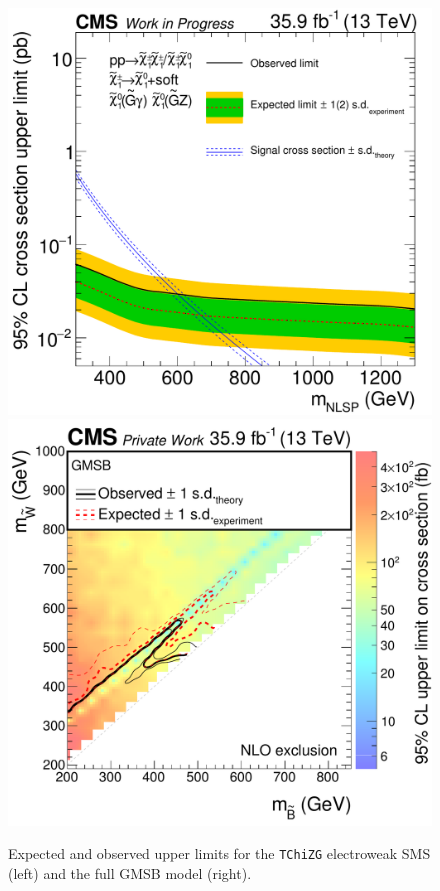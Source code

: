 \begin{figure}[tbp]
 \centering
 \includegraphics[width=\pairwidth]{figures/UnblindingPlots/TChiNG_limit2}
 \includegraphics[width=\pairwidth]{figures/UnblindingPlots/GMSB_limits_XSEC2}
 \caption{Expected and observed upper limits for the \texttt{TChiZG} electroweak SMS (left) and the full GMSB model (right).}
 \label{fig:limitEWK}
\end{figure}
